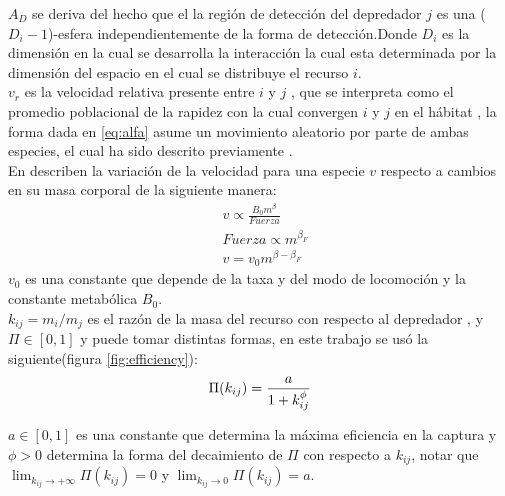 $A_D$ se deriva del hecho que el la regi\'on de detecci\'on del depredador $j$ es una ($D_i-1$)-esfera independientemente de la forma de detecci\'on\citep{pawar2012dimensionality}.Donde $D_i$ es la dimensi\'on en la cual se desarrolla la interacci\'on la cual esta determinada por la dimensi\'on del espacio en el cual se distribuye el recurso $i$.\\
$v_r$ es la velocidad relativa presente entre $i$ y $j$ , que se interpreta como el promedio poblacional de la rapidez con la cual convergen $i$ y $j$ en el h\'abitat \citep[supinfo.]{pawar2012dimensionality} , la forma dada en \eqref{eq:alfa} asume un movimiento aleatorio por parte de ambas especies, el cual ha sido descrito previamente \citep{okubo2001diffusion}.\\
En \cite{pawar2012dimensionality} describen la variaci\'on de la velocidad para una especie $v$ respecto a cambios en su masa corporal de la siguiente manera:
\begin{equation}\label{eq:vel}
\begin{aligned}
&v \propto \frac{B_0 m^\beta}{Fuerza}\\
&Fuerza \propto m^{\beta_F} \\
&v = v_0m^{\beta - \beta_F}
\end{aligned}
\end{equation}
$v_0$ es una constante que depende de la taxa y del modo de locomoci\'on y la constante metab\'olica $B_0$.\\

$k_{ij}= m_i/m_j$ es el raz\'on de la masa del recurso con respecto al depredador , y $\Pi \in [0,1]$ y  puede tomar distintas formas\citep{weitz2006size}, en este trabajo se us\'o la siguiente(figura \ref{fig:efficiency}): 
\begin{equation}\label{eq:sr}
\Pi(k_{ij}) =\frac{a}{1+k_{ij}^\phi} \\
\end{equation}

$a \in [0,1] $ es una constante que determina la m\'axima eficiencia en la captura y $\phi > 0 $ determina la forma del decaimiento de $\Pi$ con respecto a $k_{ij}$, notar que $\lim_{k_{ij} \to +\infty}  \Pi(k_{ij}) = 0$ y  $\lim_{k_{ij} \to 0} \Pi(k_{ij}) = a $.

